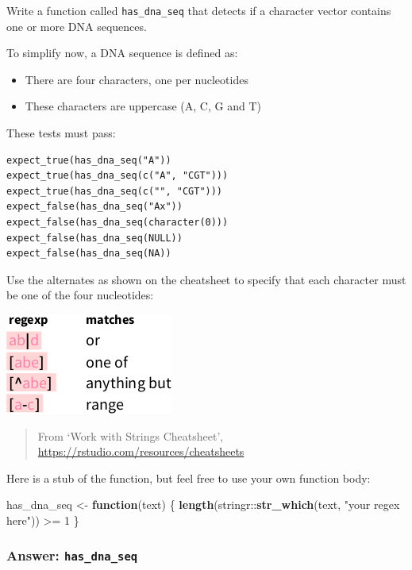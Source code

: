\documentclass[]{book}
\newenvironment{Shaded}{}{}
\newcommand{\ControlFlowTok}[1]{\textcolor[rgb]{0.00,0.44,0.13}{\textbf{#1}}}
\newcommand{\DecValTok}[1]{\textcolor[rgb]{0.25,0.63,0.44}{#1}}
\newcommand{\KeywordTok}[1]{\textcolor[rgb]{0.00,0.44,0.13}{\textbf{#1}}}
\newcommand{\NormalTok}[1]{#1}
\newcommand{\OperatorTok}[1]{\textcolor[rgb]{0.40,0.40,0.40}{#1}}
\newcommand{\StringTok}[1]{\textcolor[rgb]{0.25,0.44,0.63}{#1}}
\providecommand{\tightlist}{%
  \setlength{\itemsep}{0pt}\setlength{\parskip}{0pt}}
\begin{document}
Write a function called \texttt{has\_dna\_seq} that detects if a character
vector contains one or more DNA sequences.

To simplify now, a DNA sequence is defined as:

\begin{itemize}
\tightlist
\item
  There are four characters, one per nucleotides
\item
  These characters are uppercase (A, C, G and T)
\end{itemize}

These tests must pass:

\begin{verbatim}
expect_true(has_dna_seq("A"))
expect_true(has_dna_seq(c("A", "CGT")))
expect_true(has_dna_seq(c("", "CGT")))
expect_false(has_dna_seq("Ax"))
expect_false(has_dna_seq(character(0)))
expect_false(has_dna_seq(NULL))
expect_false(has_dna_seq(NA))
\end{verbatim}

Use the alternates as shown on the cheatsheet to specify that
each character must be one of the four nucleotides:

\includegraphics{data/06_alternates.png}

\begin{quote}
From `Work with Strings Cheatsheet', \url{https://rstudio.com/resources/cheatsheets}
\end{quote}

Here is a stub of the function, but feel free to use your own function body:

\begin{Shaded}
\begin{Highlighting}[]
\NormalTok{has_dna_seq <-}\StringTok{ }\ControlFlowTok{function}\NormalTok{(text) \{}
  \KeywordTok{length}\NormalTok{(stringr}\OperatorTok{::}\KeywordTok{str_which}\NormalTok{(text, }\StringTok{"your regex here"}\NormalTok{)) }\OperatorTok{>=}\StringTok{ }\DecValTok{1}
\NormalTok{\}}
\end{Highlighting}
\end{Shaded}

\hypertarget{answer-has_dna_seq}{%
\subsubsection{\texorpdfstring{Answer: \texttt{has\_dna\_seq}}{Answer: has\_dna\_seq}}\label{answer-has_dna_seq}}
\end{document}
